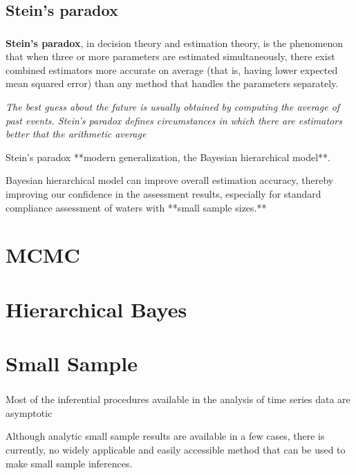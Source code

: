 \documentclass[c, dvipsnames]{beamer}  %
\begin{document}
\subsection{Stein's  paradox}


\begin{frame}[shrink=5]
\frametitle{\insertsection} 
\framesubtitle{\insertsubsection}
 
 
\textbf{Stein's  paradox}, in decision theory and estimation theory, is the phenomenon that when three or more parameters are estimated simultaneously, there exist combined estimators more accurate on average (that is, having lower expected mean squared error) than any method that handles the parameters separately. 

\textit{The best guess about the future is usually  obtained by computing the average of past events. Stein's paradox defines circumstances in which there are estimators better that the arithmetic average
}

Stein’s paradox  **modern generalization, the Bayesian hierarchical model**. 

Bayesian hierarchical model can improve overall estimation accuracy, thereby improving our confidence in the assessment results, especially for standard compliance assessment of waters with **small sample sizes.**


\end{frame}
 
\section{MCMC}
 
 
\section{Hierarchical Bayes}




\section{Small Sample}

\begin{frame}[shrink=5]
\frametitle{\insertsection} 


Most of the inferential procedures available in the analysis of time series data are asymptotic

Although analytic small sample results are available in a few cases, there is currently, no widely applicable and easily accessible method that can be used to make small sample inferences.

\end{frame}
\end{document}
